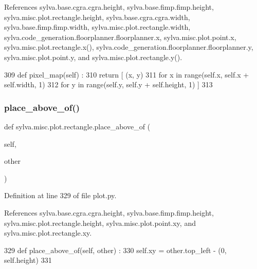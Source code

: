 References sylva.\+base.\+cgra.\+cgra.\+height, sylva.\+base.\+fimp.\+fimp.\+height, sylva.\+misc.\+plot.\+rectangle.\+height, sylva.\+base.\+cgra.\+cgra.\+width, sylva.\+base.\+fimp.\+fimp.\+width, sylva.\+misc.\+plot.\+rectangle.\+width, sylva.\+code\+\_\+generation.\+floorplanner.\+floorplanner.\+x, sylva.\+misc.\+plot.\+point.\+x, sylva.\+misc.\+plot.\+rectangle.\+x(), sylva.\+code\+\_\+generation.\+floorplanner.\+floorplanner.\+y, sylva.\+misc.\+plot.\+point.\+y, and sylva.\+misc.\+plot.\+rectangle.\+y().


\begin{DoxyCode}
309     \textcolor{keyword}{def }pixel\_map(self) :
310       \textcolor{keywordflow}{return} [ (x, y)
311         \textcolor{keywordflow}{for} x \textcolor{keywordflow}{in} range(self.x, self.x + self.width, 1)
312         \textcolor{keywordflow}{for} y \textcolor{keywordflow}{in} range(self.y, self.y + self.height, 1) ]
313 
\end{DoxyCode}
\mbox{\label{classsylva_1_1misc_1_1plot_1_1rectangle_ab0cdba67562bf45f97399b1e4529d6ac}} 
\subsubsection{\texorpdfstring{place\+\_\+above\+\_\+of()}{place\_above\_of()}}
{\footnotesize\ttfamily def sylva.\+misc.\+plot.\+rectangle.\+place\+\_\+above\+\_\+of (\begin{DoxyParamCaption}\item[{}]{self,  }\item[{}]{other }\end{DoxyParamCaption})}



Definition at line 329 of file plot.\+py.



References sylva.\+base.\+cgra.\+cgra.\+height, sylva.\+base.\+fimp.\+fimp.\+height, sylva.\+misc.\+plot.\+rectangle.\+height, sylva.\+misc.\+plot.\+point.\+xy, and sylva.\+misc.\+plot.\+rectangle.\+xy.


\begin{DoxyCode}
329     \textcolor{keyword}{def }place\_above\_of(self, other) :
330       self.xy = other.top\_left - (0, self.height)
331 
\end{DoxyCode}
\mbox{\label{classsylva_1_1misc_1_1plot_1_1rectangle_aab959379faa71fa2fff5f1797207078b}} 
